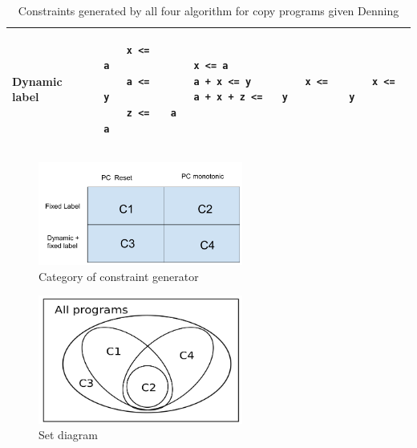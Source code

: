 \begin{table}
\begin{tabular}{|l|l|l|l|l|}
	\hline
	Dynamic label&
	\begin{lstlisting}
	x <= a
	a <= y
	z <= a
	\end{lstlisting}&
	\begin{lstlisting}
	x <= a
	a + x <= y
	a + x + z <= a
	\end{lstlisting} &
	\begin{lstlisting}
	x <= y
	\end{lstlisting}&
	\begin{lstlisting}
	x <= y
	\end{lstlisting}\\
	\hline
\end{tabular}
\label{tbl:compcopy}
\caption{Constraints generated by all four algorithm for copy programs given Denning \cite{denning}}
\end{table}
	\begin{figure}[h]
		\includegraphics[width=0.6\textwidth]{category}
		\centering
		\caption{Category of constraint generator}
		\label{fig:set}
	\end{figure}
	\begin{figure}[h]
		\includegraphics[width=0.6\textwidth]{rsz_set}
		\centering
		\caption{Set diagram}
		\label{fig:set}
	\end{figure}
